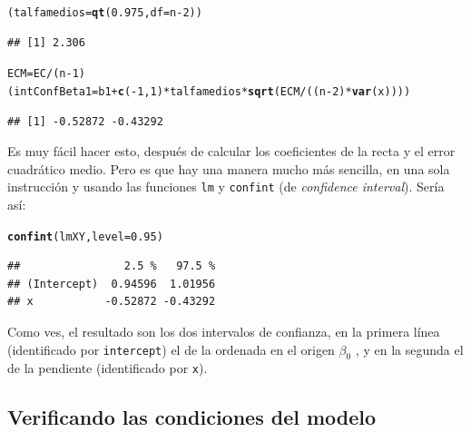\documentclass[10pt,a4paper]{article}\usepackage[]{graphicx}\usepackage[]{color}
\makeatletter
\newcommand{\hlnum}[1]{\textcolor[rgb]{0.686,0.059,0.569}{#1}}%
\newcommand{\hlopt}[1]{\textcolor[rgb]{0,0,0}{#1}}%
\newcommand{\hlstd}[1]{\textcolor[rgb]{0.345,0.345,0.345}{#1}}%
\newcommand{\hlkwb}[1]{\textcolor[rgb]{0.69,0.353,0.396}{#1}}%
\newcommand{\hlkwc}[1]{\textcolor[rgb]{0.333,0.667,0.333}{#1}}%
\newcommand{\hlkwd}[1]{\textcolor[rgb]{0.737,0.353,0.396}{\textbf{#1}}}%
\newenvironment{kframe}{%
 \def\at@end@of@kframe{}%
 \ifinner\ifhmode%
  \def\at@end@of@kframe{\end{minipage}}%
  \begin{minipage}{\columnwidth}%
 \fi\fi%
 \def\FrameCommand##1{\hskip\@totalleftmargin \hskip-\fboxsep
 \colorbox{shadecolor}{##1}\hskip-\fboxsep
     \hskip-\linewidth \hskip-\@totalleftmargin \hskip\columnwidth}%
 \MakeFramed {\advance\hsize-\width
   \@totalleftmargin\z@ \linewidth\hsize
   \@setminipage}}%
 {\par\unskip\endMakeFramed%
 \at@end@of@kframe}
\newenvironment{knitrout}{}{} %
\makeatother
\begin{document}
\begin{knitrout}
\color{fgcolor}\begin{kframe}
\begin{alltt}
\hlstd{(talfamedios} \hlkwb{=} \hlkwd{qt}\hlstd{(}\hlnum{0.975}\hlstd{,} \hlkwc{df}\hlstd{=n} \hlopt{-} \hlnum{2}\hlstd{))}
\end{alltt}
\begin{verbatim}
## [1] 2.306
\end{verbatim}
\begin{alltt}
\hlstd{ECM} \hlkwb{=} \hlstd{EC} \hlopt{/} \hlstd{(n}\hlopt{-}\hlnum{1}\hlstd{)}
\hlstd{(intConfBeta1} \hlkwb{=} \hlstd{b1} \hlopt{+} \hlkwd{c}\hlstd{(}\hlopt{-}\hlnum{1}\hlstd{,}\hlnum{1}\hlstd{)} \hlopt{*} \hlstd{talfamedios} \hlopt{*} \hlkwd{sqrt}\hlstd{(ECM} \hlopt{/}\hlstd{((n}\hlopt{-}\hlnum{2}\hlstd{)} \hlopt{*} \hlkwd{var}\hlstd{(x))))}
\end{alltt}
\begin{verbatim}
## [1] -0.52872 -0.43292
\end{verbatim}
\end{kframe}
\end{knitrout}
Es muy fácil hacer esto, después de calcular los coeficientes de la recta y el error cuadrático medio. Pero es que hay una manera mucho más sencilla, en una sola instrucción y usando las funciones {\tt lm} y {\tt confint} (de {\em confidence interval}). Sería así:
\begin{knitrout}
\color{fgcolor}\begin{kframe}
\begin{alltt}
\hlkwd{confint}\hlstd{(lmXY,} \hlkwc{level}\hlstd{=}\hlnum{0.95}\hlstd{)}
\end{alltt}
\begin{verbatim}
##                2.5 %   97.5 %
## (Intercept)  0.94596  1.01956
## x           -0.52872 -0.43292
\end{verbatim}
\end{kframe}
\end{knitrout}
Como ves, el resultado son los dos intervalos de confianza, en la primera línea (identificado por {\tt intercept}) el de la ordenada en el origen $\beta_0$ , y en la segunda el de la pendiente (identificado por {\tt x}).

\subsection{Verificando las condiciones del modelo}
\label{tut10:subsec:VerificandoCondicionesModelo}
\end{document}
